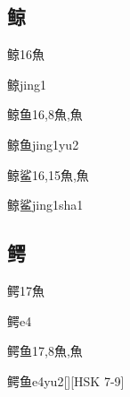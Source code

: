 \subsection*{鲸}

\begin{Entry}{鲸}{16}{⿂}
  \begin{Phonetics}{鲸}{jing1}
  \end{Phonetics}
\end{Entry}

\begin{Entry}{鲸鱼}{16,8}{⿂,⿂}
  \begin{Phonetics}{鲸鱼}{jing1yu2}
  \end{Phonetics}
\end{Entry}

\begin{Entry}{鲸鲨}{16,15}{⿂,⿂}
  \begin{Phonetics}{鲸鲨}{jing1sha1}
  \end{Phonetics}
\end{Entry}

\subsection*{鳄}

\begin{Entry}{鳄}{17}{⿂}
  \begin{Phonetics}{鳄}{e4}
  \end{Phonetics}
\end{Entry}

\begin{Entry}{鳄鱼}{17,8}{⿂,⿂}
  \begin{Phonetics}{鳄鱼}{e4yu2}[][HSK 7-9]
  \end{Phonetics}
\end{Entry}



